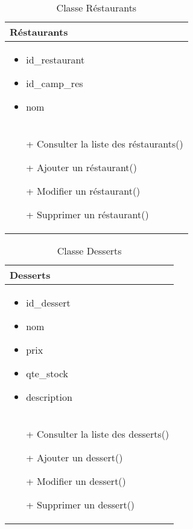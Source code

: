 \begin{table}[H]
    \begin{center}
        \begin{tabular}{|Z{5cm}|}
            \hline
            \textbf{Réstaurants}\\
            \hline
            \begin{itemize}
                \item id\_restaurant
                \item id\_camp\_res
                \item nom
            \end{itemize}\\
            \hline
            \begin{itemize}
                \item[+] Consulter la liste des réstaurants()
                \item[+] Ajouter un réstaurant()
                \item[+] Modifier un réstaurant()
                \item[+] Supprimer un réstaurant()
            \end{itemize}
            \\
            \hline
        \end{tabular}	
        \caption{Classe Réstaurants}
    \end{center}
\end{table}

\begin{table}[H]
    \begin{center}
        \begin{tabular}{|Z{5cm}|}
            \hline
            \textbf{Desserts}\\
            \hline
            \begin{itemize}
                \item id\_dessert
                \item nom
                \item prix
                \item qte\_stock
                \item description
            \end{itemize}\\
            \hline
            \begin{itemize}
                \item[+] Consulter la liste des desserts()
                \item[+] Ajouter un dessert()
                \item[+] Modifier un dessert()
                \item[+] Supprimer un dessert()
            \end{itemize}
            \\
            \hline
        \end{tabular}	
        \caption{Classe Desserts}
    \end{center}
\end{table}


